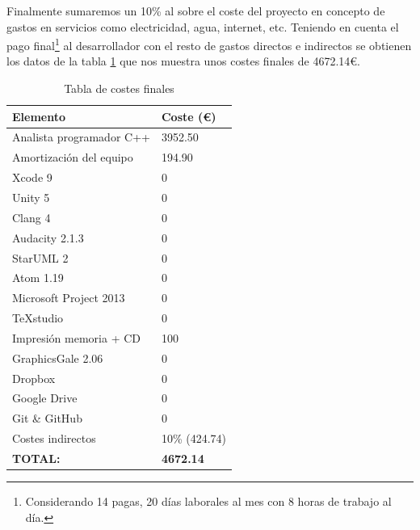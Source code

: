 \bigskip

Finalmente sumaremos un 10\% al sobre el coste del proyecto en concepto de gastos en servicios como electricidad, agua, internet, etc. Teniendo en cuenta el pago final\footnote{Considerando 14 pagas, 20 días laborales al mes con 8 horas de trabajo al día.} al desarrollador con el resto de gastos directos e indirectos se obtienen los datos de la tabla \ref{tab:coste_final} que nos muestra unos costes finales de 4672.14\euro{}.


\begin{table}
	\begin{center}
	\begin{tabular}{|l|l|}
		\hline
		\textbf{Elemento} & \textbf{Coste (\euro{})}\\
		
		\hline
		Analista programador C++ & 3952.50 \\
		\hline
		Amortización del equipo & 194.90 \\
		
		\hline
		Xcode 9& 0 \\
		
		\hline
		Unity 5& 0 \\
		
		\hline
		Clang 4& 0 \\
		
		\hline
		Audacity 2.1.3 & 0\\
		
		\hline
		StarUML 2& 0 \\
		
		\hline
		Atom 1.19& 0 \\
		
		\hline
		Microsoft Project 2013& 0 \\
		
		\hline
		TeXstudio& 0\\
		
		\hline
		Impresión memoria + CD & 100 \\
		
		\hline
		GraphicsGale 2.06& 0 \\
		
		\hline
		Dropbox& 0 \\
		
		\hline
		Google Drive& 0 \\
		
		\hline
		Git \& GitHub& 0 \\
		
		\hline
		Costes indirectos& 10\% (424.74) \\
		
		\hline
		\textbf{TOTAL: } & \textbf{4672.14} \\
		
		\hline
	\end{tabular}
	\caption{Tabla de costes finales}
	\label{tab:coste_final}
	\end{center}
\end{table}

